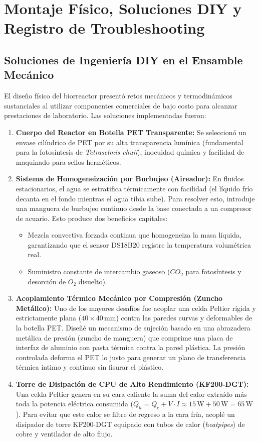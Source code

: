 \section{Montaje Físico, Soluciones DIY y Registro de Troubleshooting}

\subsection{Soluciones de Ingeniería DIY en el Ensamble Mecánico}
El diseño físico del biorreactor presentó retos mecánicos y termodinámicos sustanciales al utilizar componentes comerciales de bajo costo para alcanzar prestaciones de laboratorio. Las soluciones implementadas fueron:

\begin{enumerate}[label=\textbf{\arabic*.}]
    \item \textbf{Cuerpo del Reactor en Botella PET Transparente:}
    Se seleccionó un envase cilíndrico de PET por su alta transparencia lumínica (fundamental para la fotosíntesis de \textit{Tetraselmis chuii}), inocuidad química y facilidad de maquinado para sellos herméticos.

    \item \textbf{Sistema de Homogeneización por Burbujeo (Aireador):}
    En fluidos estacionarios, el agua se estratifica térmicamente con facilidad (el líquido frío decanta en el fondo mientras el agua tibia sube). Para resolver esto, introduje una manguera de burbujeo continuo desde la base conectada a un compresor de acuario. Esto produce dos beneficios capitales:
    \begin{itemize}
        \item Mezcla convectiva forzada continua que homogeneiza la masa líquida, garantizando que el sensor DS18B20 registre la temperatura volumétrica real.
        \item Suministro constante de intercambio gaseoso ($CO_2$ para fotosíntesis y desorción de $O_2$ disuelto).
    \end{itemize}

    \item \textbf{Acoplamiento Térmico Mecánico por Compresión (Zuncho Metálico):}
    Uno de los mayores desafíos fue acoplar una celda Peltier rígida y estrictamente plana ($40 \times 40\,\text{mm}$) contra las paredes curvas y deformables de la botella PET. Diseñé un mecanismo de sujeción basado en una abrazadera metálica de presión (zuncho de manguera) que comprime una placa de interfaz de aluminio con pasta térmica contra la pared plástica. La presión controlada deforma el PET lo justo para generar un plano de transferencia térmica íntimo y continuo sin fisurar el plástico.

    \item \textbf{Torre de Disipación de CPU de Alto Rendimiento (KF200-DGT):}
    Una celda Peltier genera en su cara caliente la suma del calor extraído más toda la potencia eléctrica consumida ($Q_h = Q_c + V \cdot I \approx 15\,\text{W} + 50\,\text{W} = 65\,\text{W}$). Para evitar que este calor se filtre de regreso a la cara fría, acoplé un disipador de torre KF200-DGT equipado con tubos de calor (\textit{heatpipes}) de cobre y ventilador de alto flujo.
\end{enumerate}

